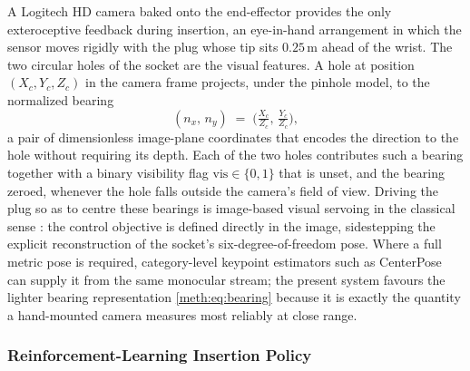 A Logitech HD camera baked onto the end-effector provides the only exteroceptive feedback during insertion, an eye-in-hand arrangement in which the sensor moves rigidly with the plug whose tip sits $\ensuremath{0.25\,\mathrm{m}}$ ahead of the wrist. The two circular holes of the socket are the visual features. A hole at position $(X_c, Y_c, Z_c)$ in the camera frame projects, under the pinhole model, to the normalized bearing
\begin{equation}
  (n_x,\, n_y) \;=\; \Big(\tfrac{X_c}{Z_c},\, \tfrac{Y_c}{Z_c}\Big),
  \label{meth:eq:bearing}
\end{equation}
a pair of dimensionless image-plane coordinates that encodes the direction to the hole without requiring its depth. Each of the two holes contributes such a bearing together with a binary visibility flag $\mathrm{vis}\in\{0,1\}$ that is unset, and the bearing zeroed, whenever the hole falls outside the camera's field of view. Driving the plug so as to centre these bearings is image-based visual servoing in the classical sense \cite{chaumette_2006_visualservo}: the control objective is defined directly in the image, sidestepping the explicit reconstruction of the socket's six-degree-of-freedom pose. Where a full metric pose is required, category-level keypoint estimators such as CenterPose \cite{lin_2022_centerpose} can supply it from the same monocular stream; the present system favours the lighter bearing representation \eqref{meth:eq:bearing} because it is exactly the quantity a hand-mounted camera measures most reliably at close range.

\subsubsection{Reinforcement-Learning Insertion Policy}\label{meth:sec:manip:rl}

